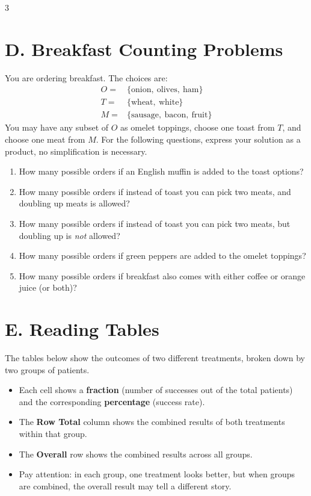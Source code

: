 \documentclass[9pt]{article}
\begin{document}
\begin{multicols}{3}
\section*{D. Breakfast Counting Problems}

You are ordering breakfast. The choices are:
\begin{align*}
O=&\{\text{onion},\ \text{olives},\ \text{ham}\}\\
T=&\{\text{wheat},\ \text{white}\}\\
M=&\{\text{sausage},\ \text{bacon},\ \text{fruit}\}
\end{align*}
You may have any subset of $O$ as omelet toppings, choose one toast from $T$, and choose one meat from $M$. For the following questions, express your solution as a product, no simplification is necessary.

\begin{enumerate}[label=\arabic*., start=1]

\item  
How many possible orders if an English muffin is added to the toast options?

\item  
How many possible orders if instead of toast you can pick two meats, and doubling up meats is allowed?

\item  
How many possible orders if instead of toast you can pick two meats, but doubling up is \emph{not} allowed?

\item  
How many possible orders if green peppers are added to the omelet toppings?

\item  
How many possible orders if breakfast also comes with either coffee or orange juice (or both)?

\end{enumerate}

\end{multicols}
\newpage
\section*{E. Reading Tables}

The tables below show the outcomes of two different treatments, broken down by two groups of patients.  

\begin{itemize}
  \item Each cell shows a \textbf{fraction} (number of successes out of the total patients) and the corresponding \textbf{percentage} (success rate).
  \item The \textbf{Row Total} column shows the combined results of both treatments within that group.
  \item The \textbf{Overall} row shows the combined results across all groups.
  \item Pay attention: in each group, one treatment looks better, but when groups are combined, the overall result may tell a different story.
\end{itemize}
\end{document}

